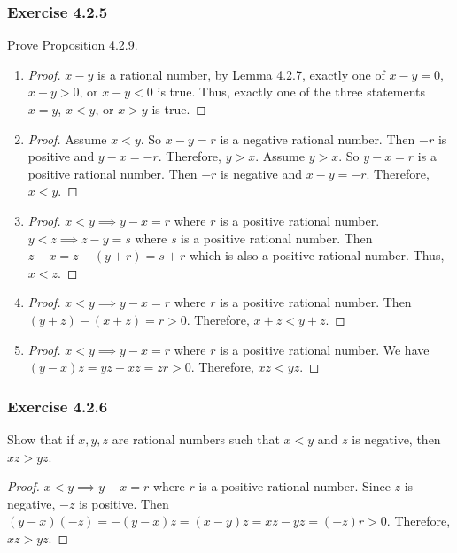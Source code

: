 \documentclass[12pt, letter]{article}
\begin{document}
\subsubsection*{Exercise 4.2.5}
Prove Proposition 4.2.9.
\begin{enumerate}[label=(\alph*)]
    \item \begin{proof}
        $x-y$ is a rational number, by Lemma 4.2.7, exactly one of $x-y=0$, $x-y>0$, or $x-y<0$ is true. Thus, exactly one of the three statements $x=y$, $x<y$, or 
        $x>y$ is true.
    \end{proof}
    \item \begin{proof}
        Assume $x<y$. So $x-y=r$ is a negative rational number. Then $-r$ is positive and $y-x=-r$. Therefore, $y>x$. 
        Assume $y>x$. So $y-x=r$ is a positive rational number. Then $-r$ is negative and $x-y=-r$. Therefore, $x<y$.
    \end{proof}
    \item \begin{proof}
        $x<y\implies y-x=r$ where $r$ is a positive rational number. $y<z\implies z-y=s$ where $s$ is a positive rational number. Then $z-x=z-(y+r)=s+r$ which is also 
        a positive rational number. Thus, $x<z$.
    \end{proof}
    \item \begin{proof}
        $x<y\implies y-x=r$ where $r$ is a positive rational number. Then $(y+z)-(x+z)=r>0$. Therefore, $x+z<y+z$.
    \end{proof}
    \item \begin{proof}
        $x<y\implies y-x=r$ where $r$ is a positive rational number. We have $(y-x)z=yz-xz=zr>0$. Therefore, $xz<yz$.
    \end{proof}
\end{enumerate}
\subsubsection*{Exercise 4.2.6}
Show that if $x,y,z$ are rational numbers such that $x<y$ and $z$ is negative, then $xz>yz$.
\begin{proof}
    $x<y\implies y-x=r$ where $r$ is a positive rational number. Since $z$ is negative, $-z$ is positive. Then $(y-x)(-z)=-(y-x)z=(x-y)z=xz-yz=(-z)r>0$.
    Therefore, $xz>yz$. 
\end{proof}
\end{document}
